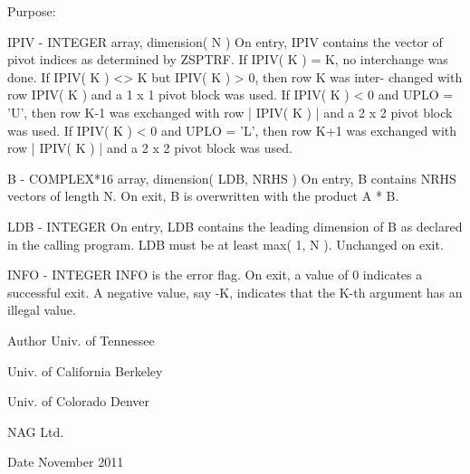 \begin{DoxyParagraph}{Purpose\+: }
\begin{DoxyVerb}
  IPIV   - INTEGER array, dimension( N )
           On entry, IPIV contains the vector of pivot indices as
           determined by ZSPTRF.
           If IPIV( K ) = K, no interchange was done.
           If IPIV( K ) <> K but IPIV( K ) > 0, then row K was inter-
           changed with row IPIV( K ) and a 1 x 1 pivot block was used.
           If IPIV( K ) < 0 and UPLO = 'U', then row K-1 was exchanged
           with row | IPIV( K ) | and a 2 x 2 pivot block was used.
           If IPIV( K ) < 0 and UPLO = 'L', then row K+1 was exchanged
           with row | IPIV( K ) | and a 2 x 2 pivot block was used.

  B      - COMPLEX*16 array, dimension( LDB, NRHS )
           On entry, B contains NRHS vectors of length N.
           On exit, B is overwritten with the product A * B.

  LDB    - INTEGER
           On entry, LDB contains the leading dimension of B as
           declared in the calling program.  LDB must be at least
           max( 1, N ).
           Unchanged on exit.

  INFO   - INTEGER
           INFO is the error flag.
           On exit, a value of 0 indicates a successful exit.
           A negative value, say -K, indicates that the K-th argument
           has an illegal value.\end{DoxyVerb}
 
\end{DoxyParagraph}
\begin{DoxyAuthor}{Author}
Univ. of Tennessee 

Univ. of California Berkeley 

Univ. of Colorado Denver 

N\+A\+G Ltd. 
\end{DoxyAuthor}
\begin{DoxyDate}{Date}
November 2011 
\end{DoxyDate}
\hypertarget{group__complex16__lin_ga2728fb8c1a2c82e2e1b3a25a3178d666}{}

